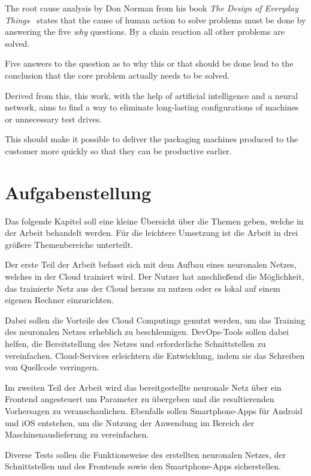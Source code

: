 The root cause analysis by Don Norman from his book \textit{The Design of Everyday
Things}~\cite{book_einleitung_donnorman} states that the cause of human action to solve problems must be done by
answering the five \textit{why} questions. By a chain reaction all other problems are solved.

Five answers to the question as to why this or that should be done lead to the conclusion that the core problem actually
needs to be solved.

Derived from this, this work, with the help of artificial intelligence and a neural network, aims to find a way to
eliminate long-lasting configurations of machines or unnecessary test drives.

This should make it possible to deliver the packaging machines produced to the customer more quickly so that they can be
productive earlier.

\newpage

\section{Aufgabenstellung}
\label{sec:aufgabenstellung}
Das folgende Kapitel soll eine kleine Übersicht über die Themen geben, welche in der Arbeit behandelt werden. Für die
leichtere Umsetzung ist die Arbeit in drei größere Themenbereiche unterteilt.

Der erste Teil der Arbeit befasst sich mit dem Aufbau eines neuronalen Netzes, welches in der Cloud trainiert wird. Der
Nutzer hat anschließend die Möglichkeit, das trainierte Netz aus der Cloud heraus zu nutzen oder es lokal auf einem
eigenen Rechner einzurichten.

Dabei sollen die Vorteile des Cloud Computings genutzt werden, um das Training des neuronalen Netzes erheblich zu
beschleunigen. DevOps-Tools sollen dabei helfen, die Bereitstellung des Netzes und erforderliche Schnittstellen zu
vereinfachen. Cloud-Services erleichtern die Entwicklung, indem sie das Schreiben von Quellcode verringern.

Im zweiten Teil der Arbeit wird das bereitgestellte neuronale Netz über ein Frontend angesteuert um Parameter zu
übergeben und die resultierenden Vorhersagen zu veranschaulichen. Ebenfalls sollen Smartphone-Apps für Android und iOS
entstehen, um die Nutzung der Anwendung im Bereich der Maschinenauslieferung zu vereinfachen.

Diverse Tests sollen die Funktionsweise des erstellten neuronalen Netzes, der Schnittstellen und des Frontends
sowie den Smartphone-Apps sicherstellen.


